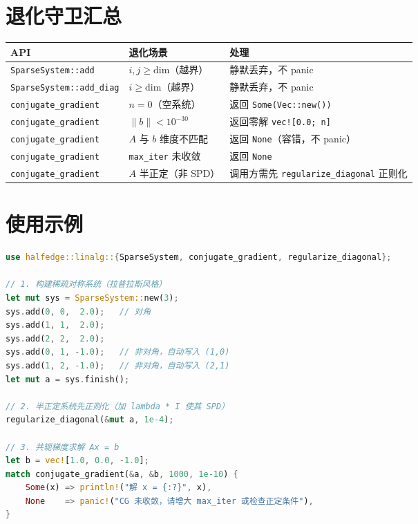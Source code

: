 \documentclass[11pt,a4paper]{article}
\begin{document}
\section{退化守卫汇总}

\begin{center}
\renewcommand{\arraystretch}{1.18}
\begin{tabular}{@{}lll@{}}
  \toprule
  \textbf{API} & \textbf{退化场景} & \textbf{处理} \\
  \midrule
  \texttt{SparseSystem::add}        & $i, j \ge \text{dim}$（越界） & 静默丢弃，不 panic \\
  \texttt{SparseSystem::add\_diag}  & $i \ge \text{dim}$（越界）     & 静默丢弃，不 panic \\
  \texttt{conjugate\_gradient}      & $n = 0$（空系统）              & 返回 \texttt{Some(Vec::new())} \\
  \texttt{conjugate\_gradient}      & $\|b\| < 10^{-30}$             & 返回零解 \texttt{vec![0.0; n]} \\
  \texttt{conjugate\_gradient}      & $A$ 与 $b$ 维度不匹配           & 返回 \texttt{None}（容错，不 panic） \\
  \texttt{conjugate\_gradient}      & \texttt{max\_iter} 未收敛       & 返回 \texttt{None} \\
  \texttt{conjugate\_gradient}      & $A$ 半正定（非 SPD）            & 调用方需先 \texttt{regularize\_diagonal} 正则化 \\
  \bottomrule
\end{tabular}
\end{center}

\section{使用示例}

\begin{lstlisting}[language=Rust]
use halfedge::linalg::{SparseSystem, conjugate_gradient, regularize_diagonal};

// 1. 构建稀疏对称系统（拉普拉斯风格）
let mut sys = SparseSystem::new(3);
sys.add(0, 0,  2.0);   // 对角
sys.add(1, 1,  2.0);
sys.add(2, 2,  2.0);
sys.add(0, 1, -1.0);   // 非对角，自动写入 (1,0)
sys.add(1, 2, -1.0);   // 非对角，自动写入 (2,1)
let mut a = sys.finish();

// 2. 半正定系统先正则化（加 lambda * I 使其 SPD）
regularize_diagonal(&mut a, 1e-4);

// 3. 共轭梯度求解 Ax = b
let b = vec![1.0, 0.0, -1.0];
match conjugate_gradient(&a, &b, 1000, 1e-10) {
    Some(x) => println!("解 x = {:?}", x),
    None    => panic!("CG 未收敛，请增大 max_iter 或检查正定条件"),
}
\end{lstlisting}
\end{document}

